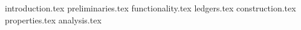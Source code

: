 {introduction.tex}
{preliminaries.tex}
{functionality.tex}
{ledgers.tex}
{construction.tex}
{properties.tex}
{analysis.tex}

